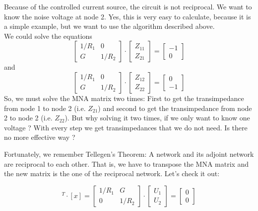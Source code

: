 Because of the controlled current source, the circuit is not
reciprocal. We want to know the noise voltage at node 2. Yes,
this is very easy to calculate, because it is a simple example,
but we want to use the algorithm described above.\\
We could solve the equations
\begin{equation}
\begin{bmatrix}
1/R_1 & 0\\
  G   & 1/R_2
\end{bmatrix}
\cdot
\begin{bmatrix}
Z_{11}\\
Z_{21}
\end{bmatrix}
=
\begin{bmatrix}
-1\\
0
\end{bmatrix}
\end{equation}
and
\begin{equation}
\begin{bmatrix}
1/R_1 & 0\\
  G   & 1/R_2
\end{bmatrix}
\cdot
\begin{bmatrix}
Z_{12}\\
Z_{22}
\end{bmatrix}
=
\begin{bmatrix}
0\\
-1
\end{bmatrix}
\end{equation}
So, we must solve the MNA matrix two times: First to get the
transimpedance from node 1 to node 2 (i.e. $Z_{21}$) and
second to get the transimpedance from node 2 to node 2 (i.e.
$Z_{22}$). But why solving it two times, if we only want to
know one voltage ? With every step we get transimpedances
that we do not need. Is there no more effective way ?

\addvspace{12pt}

Fortunately, we remember Tellegen's Theorem: A network and
its adjoint network are reciprocal to each other. That is,
we have to transpose the MNA matrix and the new matrix is
the one of the reciprocal network. Let's check it out:

\begin{equation}
[A]^T\cdot [x] =
\begin{bmatrix}
1/R_1 & G\\
  0   & 1/R_2
\end{bmatrix}
\cdot
\begin{bmatrix}
U_1\\
U_2
\end{bmatrix}
=
\begin{bmatrix}
0\\
0
\end{bmatrix}
\end{equation}

